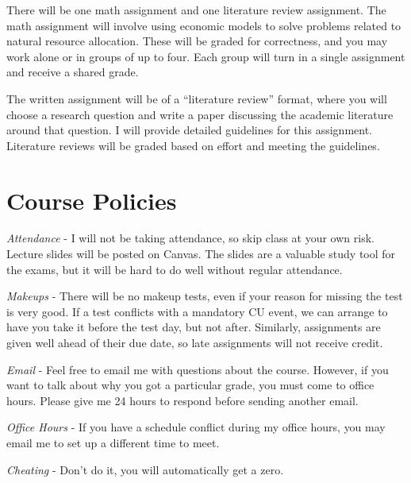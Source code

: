 \documentclass[11pt]{article}
\begin{document}
There will be one math assignment and one literature review assignment. The math assignment will involve using economic models to solve problems related to natural resource allocation. These will be graded for correctness, and you may work alone or in groups of up to four. Each group will turn in a single assignment and receive a shared grade.

The written assignment will be of a “literature review” format, where you will choose a research question and write a paper discussing the academic literature around that question. I will provide detailed guidelines for this assignment. Literature reviews will be graded based on effort and meeting the guidelines.




\section*{Course Policies}
\textit{Attendance} - I will not be taking attendance, so skip class at your own risk. Lecture slides will be posted on Canvas. The slides are a valuable study tool for the exams, but it will be hard to do well without regular attendance.


\vspace{5mm}\noindent
\textit{Makeups} - There will be no makeup tests, even if your reason for missing the test is very good. If a test conflicts with a mandatory CU event, we can arrange to have you take it before the test day, but not after. Similarly, assignments are given well ahead of their due date, so late assignments will not receive credit.


\vspace{5mm}\noindent
\textit{Email} - Feel free to email me with questions about the course. However, if you want to talk about why you got a particular grade, you must come to office hours. Please give me 24 hours to respond before sending another email.


\vspace{5mm}\noindent
\textit{Office Hours} - If you have a schedule conflict during my office hours, you may email me to set up a different time to meet.


\vspace{5mm}\noindent
\textit{Cheating} - Don’t do it, you will automatically get a zero.

\newpage
\end{document}
